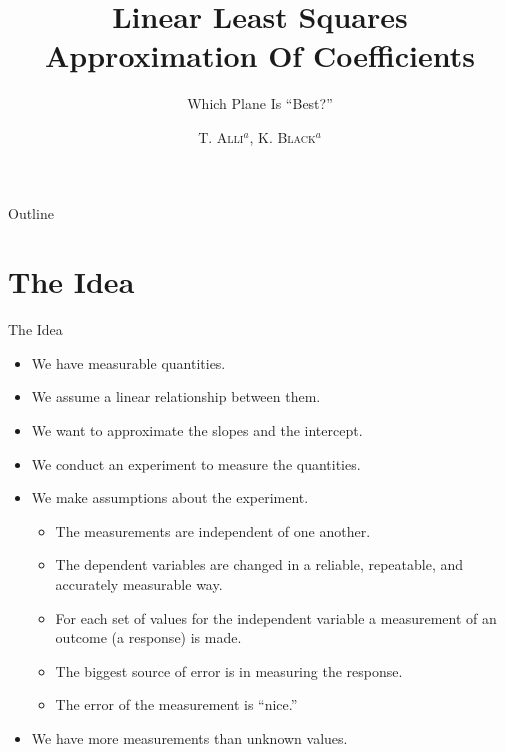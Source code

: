 \documentclass[svgnames,table,,aspectratio=169]{beamer}
\begin{document}
\author{\textsc{T. Alli$^{a}$, K. Black$^{a}$}}
\subject{Linear Algebra}


\title{Linear Least Squares Approximation Of Coefficients}
\subtitle{Which Plane Is ``Best?''}


\date{} %

\begin{frame}
  \titlepage
\end{frame}

\begin{frame}{Outline}
  \tableofcontents
\end{frame}


\section{The Idea}

\begin{frame}{The Idea}

  \begin{itemize}
  \item We have measurable quantities.
  \item We assume a linear relationship between them.
  \item We want to approximate the slopes and the intercept.
  \item We conduct an experiment to measure the quantities.
  \item We make assumptions about the experiment.
    \begin{itemize}
    \item The measurements are independent of one another.
    \item The dependent variables are changed in a reliable, repeatable, and
      accurately measurable way.
    \item For each set of values for the independent variable a
      measurement of an outcome (a response) is made.
    \item The biggest source of error is in measuring the response.
    \item The error of the measurement is ``nice.''
    \end{itemize}
  \item We have more measurements than unknown values.
  \end{itemize}

\end{frame}
\end{document}

